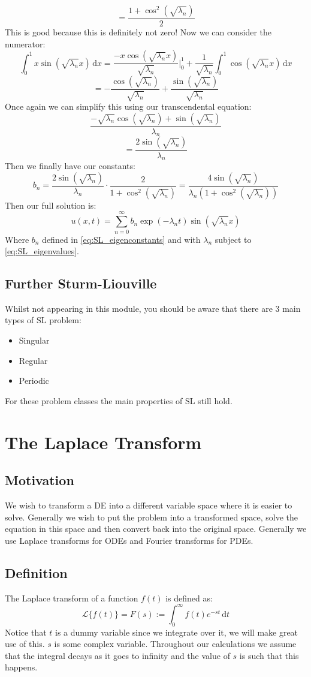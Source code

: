 \documentclass[12pt]{article}
\begin{document}
\[=\frac{1+\cos^2(\sqrt{\lambda_n})}{2}\]
This is good because this is definitely not zero! Now we can consider the numerator:
\[\int^1_0x\sin(\sqrt{\lambda_n}x)\,\text{d}x=\frac{-x\cos(\sqrt{\lambda_n}x)}{\sqrt{\lambda_n}}\bigl|^1_0+\frac{1}{\sqrt{\lambda_n}}\int^1_0\cos(\sqrt{\lambda_n}x)\,\text{d}x\]
\[=-\frac{\cos(\sqrt{\lambda_n})}{\sqrt{\lambda_n}}+\frac{\sin(\sqrt{\lambda_n})}{\sqrt{\lambda_n}}\]
Once again we can simplify this using our transcendental equation:
\[\frac{-\sqrt{\lambda_n}\cos(\sqrt{\lambda_n})+\sin(\sqrt{\lambda_n})}{\lambda_n}\]
\[=\frac{2\sin(\sqrt{\lambda_n})}{\lambda_n}\]
Then we finally have our constants:
\begin{equation}
    b_n=\frac{2\sin(\sqrt{\lambda_n})}{\lambda_n}\cdot\frac{2}{1+\cos^2(\sqrt{\lambda_n})}=\frac{4\sin(\sqrt{\lambda_n})}{\lambda_n(1+\cos^2(\sqrt{\lambda_n}))}
    \tag{\(\ddagger\)}
    \label{eq:SL_eigenconstants}
\end{equation}
Then our full solution is:
\[u(x,t)=\sum^\infty_{n=0}b_n\exp(-\lambda_nt)\sin(\sqrt{\lambda_n}x)\]
Where \(b_n\) defined in \eqref{eq:SL_eigenconstants} and with \(\lambda_n\) subject to \eqref{eq:SL_eigenvalues}.
\subsection{Further Sturm-Liouville}
Whilst not appearing in this module, you should be aware that there are 3 main types of SL problem:
\begin{itemize}
    \item Singular
    \item Regular
    \item Periodic
\end{itemize}
For these problem classes the main properties of SL still hold.
\clearpage
\section{The Laplace Transform}
\subsection{Motivation}
We wish to transform a DE into a different variable space where it is easier to solve. Generally we wish to put the problem into a transformed space, solve the equation in this space and then convert back into the original space. Generally we use Laplace transforms for ODEs and Fourier transforms for PDEs.
\subsection{Definition}
The Laplace transform of a function \(f(t)\) is defined as:
\[\mathcal{L}\{f(t)\}=F(s):=\int^\infty_0f(t)e^{-st}\,\text{d}t\]
Notice that \(t\) is a dummy variable since we integrate over it, we will make great use of this. \(s\) is some complex variable. Throughout our calculations we assume that the integral decays as it goes to infinity and the value of \(s\) is such that this happens.
\end{document}
